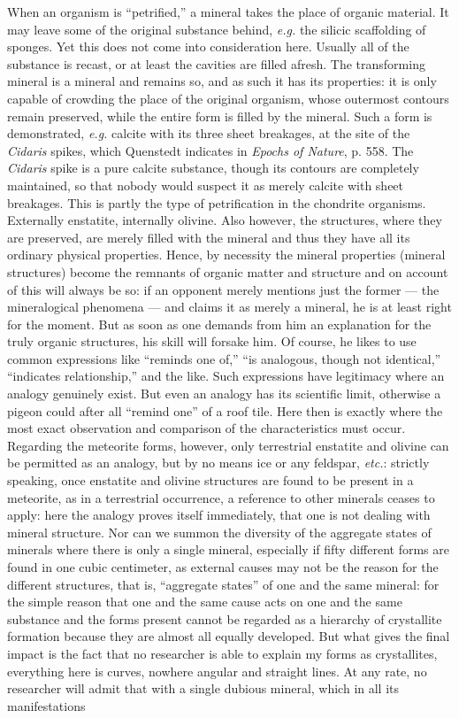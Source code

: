 \documentclass[a4paper, 12pt, oneside]{article}
\begin{document}
When an organism is ``petrified,'' a mineral takes the place of organic material. It may leave some of the original substance behind, \emph{e.g.} the silicic scaffolding of sponges. Yet this does not come into consideration here. Usually all of the substance is recast, or at least the cavities are filled afresh. The transforming mineral is a mineral and remains so, and as such it has its properties: it is only capable of crowding the place of the original organism, whose outermost contours remain preserved, while the entire form is filled by the mineral. Such a form is demonstrated, \emph{e.g.} calcite with its three sheet breakages, at the site of the \emph{Cidaris} spikes, which Quenstedt indicates in \emph{Epochs of Nature}, p. 558. The \emph{Cidaris} spike is a pure calcite substance, though its contours are completely maintained, so that nobody would suspect it as merely calcite with sheet breakages. This is partly the type of petrification in the chondrite organisms. Externally enstatite, internally olivine. Also however, the structures, where they are preserved, are merely filled with the mineral and thus they have all its ordinary physical properties. Hence, by necessity the mineral properties (mineral structures) become the remnants of organic matter and structure and on account of this will always be so: if an opponent merely mentions just the former --- the mineralogical phenomena --- and claims it as merely a mineral, he is at least right for the moment. But as soon as one demands from him an explanation for the truly organic structures, his skill will forsake him. Of course, he likes to use common expressions like ``reminds one of,'' ``is analogous, though not identical,'' ``indicates relationship,'' and the like. Such expressions have legitimacy where an analogy genuinely exist. But even an analogy has its scientific limit, otherwise a pigeon could after all ``remind one'' of a roof tile. Here then is exactly where the most exact observation and comparison of the characteristics must occur. Regarding the meteorite forms, however, only terrestrial enstatite and olivine can be permitted as an analogy, but by no means ice or any feldspar, \emph{etc.}: strictly speaking, once enstatite and olivine structures are found to be present in a meteorite, as in a terrestrial occurrence, a reference to other minerals ceases to apply: here the analogy proves itself immediately, that one is not dealing with mineral structure. Nor can we summon the diversity of the aggregate states of minerals where there is only a single mineral, especially if fifty different forms are found in one cubic centimeter, as external causes may not be the reason for the different structures, that is, ``aggregate states'' of one and the same mineral: for the simple reason that one and the same cause acts on one and the same substance and the forms present cannot be regarded as a hierarchy of crystallite formation because they are almost all equally developed. But what gives the final impact is the fact that no researcher is able to explain my forms as crystallites, everything here is curves, nowhere angular and straight lines. At any rate, no researcher will admit that with a single dubious mineral, which in all its manifestations 
\end{document}
